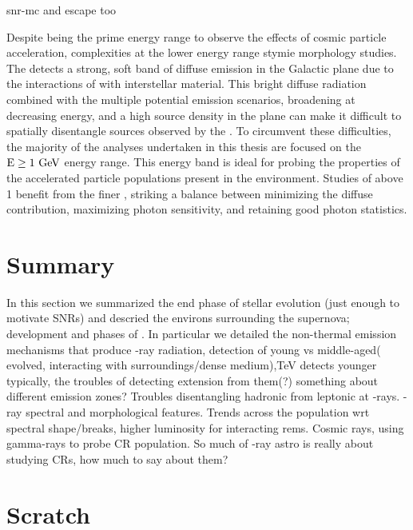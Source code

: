 
snr-mc and escape too









Despite being the prime energy range to observe the effects of cosmic particle acceleration, complexities at the lower \lat{} energy range stymie \snr{} morphology studies. The \lat{} detects a strong, soft band of diffuse emission in the Galactic plane due to the interactions of \crs{} with interstellar material. This bright diffuse radiation combined with the multiple potential emission scenarios, broadening \psf{} at decreasing energy, and a high source density in the plane can make it difficult to spatially disentangle sources observed by the \lat{}. To circumvent these 
difficulties, the majority of the analyses undertaken in this thesis are focused on the ${\rm E \geq 1~\mathrm{GeV}}$ energy range. This energy band is ideal for probing the properties of the accelerated particle populations present in the \snr{} environment. Studies of  \snrs{}  above 1\gev{} benefit from the finer \lat{} \psf{}, striking a balance between minimizing the diffuse contribution, maximizing photon sensitivity, and retaining good photon statistics.

\section{Summary}\label{Rems:summ} In this section we summarized the end phase of stellar evolution (just enough to motivate SNRs) and descried the environs surrounding the supernova; development and phases of \snrs{}.  In particular we detailed the non-thermal emission mechanisms that produce \g-ray radiation, detection of young vs middle-aged( evolved, interacting with surroundings/dense medium),TeV detects younger typically, the troubles of detecting extension from them(?) something about different emission zones? Troubles disentangling hadronic from leptonic at \g-rays. \g-ray spectral and morphological features. Trends across the population wrt spectral shape/breaks, higher luminosity for interacting rems. Cosmic rays, using gamma-rays to probe CR population. So much of \g-ray astro is really about studying CRs, how much to say about them? 

\section{Scratch}

\cite{Montmerle79}
